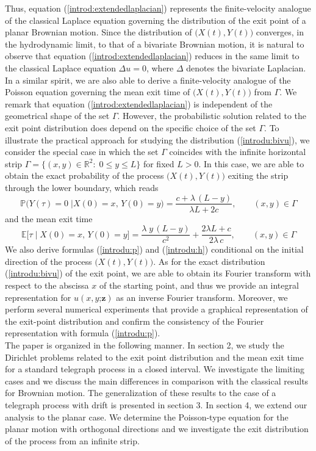 \documentclass{article}
\begin{document}
Thus, equation (\ref{introd:extendedlaplacian}) represents the finite-velocity analogue of the classical Laplace equation governing the distribution of the exit point of a planar Brownian motion. Since the distribution of $\big(X(t),Y(t)\big)$ converges, in the hydrodynamic limit, to that of a bivariate Brownian motion, it is natural to observe that equation (\ref{introd:extendedlaplacian}) reduces in the same limit to the classical Laplace equation $\Delta u = 0$, where $\Delta$ denotes the bivariate Laplacian. In a similar spirit, we are also able to derive a finite-velocity analogue of the Poisson equation governing the mean exit time of $\big(X(t),Y(t)\big)$ from $\Gamma$. We remark that equation (\ref{introd:extendedlaplacian}) is independent of the geometrical shape of the set $\Gamma$. However, the probabilistic solution related to the exit point distribution does depend on the specific choice of the set $\Gamma$. To illustrate the practical approach for studying the distribution (\ref{introdu:bivu}), we consider the special case in which the set $\Gamma$ coincides with the infinite horizontal strip $\Gamma=\{(x,y)\in\mathbb{R}^2:\;0\le y\le L\}$ for fixed $L>0$. In this case, we are able to obtain the exact probability of the process $\big(X(t),Y(t)\big)$ exiting the strip through the lower boundary, which reads
\begin{equation}\label{introdu:p}\mathbb{P}\Big(Y(\tau)=0\;\Big\lvert X(0)=x,\,Y(0)=y\Big)=\frac{c+\lambda\,(L-y)}{\lambda L+2c},\qquad (x,y)\in\Gamma\end{equation}
and the mean exit time
\begin{equation}\label{introdu:h}\mathbb{E}\Big[\tau\;\Big\lvert\;X(0)=x,\,Y(0)=y\Big]=\frac{\lambda\;y\,(L-y)}{c^2}+\frac{2\lambda L +c}{2\lambda\,c},\qquad (x,y)\in\Gamma\end{equation}
We also derive formulas (\ref{introdu:p}) and (\ref{introdu:h}) conditional on the initial direction of the process $\big(X(t),Y(t)\big)$. As for the exact distribution (\ref{introdu:bivu}) of the exit point, we are able to obtain its Fourier transform with respect to the abscissa $x$ of the starting point, and thus we provide an integral representation for $u(x,y\mathord{;}\mathbf{z})$ as an inverse Fourier transform. Moreover, we perform several numerical experiments that provide a graphical representation of the exit-point distribution and confirm the consistency of the Fourier representation with formula (\ref{introdu:p}).\\
The paper is organized in the following manner. In section 2, we study the Dirichlet problems related to the exit point distribution and the mean exit time for a standard telegraph process in a closed interval. We investigate the limiting cases and we discuss the main differences in comparison with the classical results for Brownian motion. The generalization of these results to the case of a telegraph process with drift is presented in section 3. In section 4, we extend our analysis to the planar case. We determine the Poisson-type equation for the planar motion with orthogonal directions and we investigate the exit distribution of the process from an infinite strip.
\end{document}
